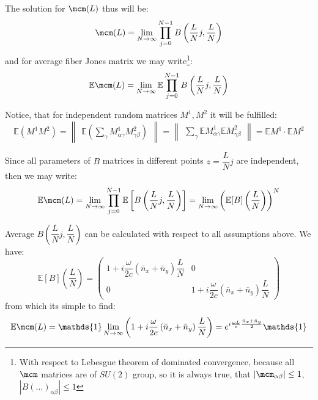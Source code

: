 \documentclass[12pt, notitlepage]{report}
\begin{document}
The solution for $\mcm(L)$ thus will be:
\begin{equation*}
	\mcm(L) = \lim\limits_{N\rightarrow\infty}\prod\limits_{j=0}^{N-1} B\left(\dfrac{L}{N}j, \dfrac{L}{N}\right)
\end{equation*}
and for average fiber Jones matrix we may write\footnote{With respect to Lebesgue theorem of dominated convergence, because all $\mcm$ matrices are of $SU(2)$ group, so it is always true, that $|\mcm_{\alpha\beta}| \leq 1$, $|B(\dots)_{\alpha\beta}| \leq 1$}:
\begin{equation*}
	\mathbb{E}\mcm(L) = \lim\limits_{N\rightarrow\infty}\mathbb{E}\prod\limits_{j=0}^{N-1} B\left(\dfrac{L}{N}j, \dfrac{L}{N}\right)
\end{equation*}

Notice, that for independent random matrices $M^1, M^2$ it will be fulfilled:
\begin{equation*}
	\mathbb{E}\left(M^1 M^2\right) = \begin{Vmatrix}
		\mathbb{E}\left(\sum_\gamma M^1_{\alpha\gamma}M^2_{\gamma\beta}\right) 
	\end{Vmatrix} = \begin{Vmatrix}
	\sum_\gamma \mathbb{E}M^1_{\alpha\gamma} \mathbb{E}M^2_{\gamma\beta}
\end{Vmatrix} = \mathbb{E}M^1\cdot \mathbb{E}M^2
\end{equation*}


Since all parameters of $B$ matrices in different points $z = \dfrac{L}{N}j$ are independent, then we may write:
\begin{equation*}
	\mathbb{E}\mcm(L) = \lim\limits_{N\rightarrow\infty}\prod\limits_{j=0}^{N-1} \mathbb{E}\left[B\left(\dfrac{L}{N}j, \dfrac{L}{N}\right)\right] = \lim\limits_{N\rightarrow\infty} \left(\mathbb{E}[B]\left(\dfrac{L}{N}\right)\right)^N
\end{equation*}

Average $B\left(\dfrac{L}{N}j, \dfrac{L}{N}\right)$ can be calculated with respect to all assumptions above. We have:
\begin{equation*}
	\mathbb{E}[B]\left(\dfrac{L}{N}\right) = \begin{pmatrix}
		1 + i\dfrac{\omega}{2c}\left(\bar{n}_x + \bar{n}_y\right)\dfrac{L}{N} & 0 \\
		0 & 1 + i\dfrac{\omega}{2c}\left(\bar{n}_x + \bar{n}_y\right)\dfrac{L}{N}
	\end{pmatrix}
\end{equation*}
from which its simple to find:
\begin{equation}
	\mathbb{E}\mcm(L) = \mathds{1}\lim\limits_{N\rightarrow\infty}\left(1 + i\dfrac{\omega}{2c}\left(\bar{n}_x + \bar{n}_y\right)\dfrac{L}{N} \right) =  e^{i\frac{\omega L}{c}\frac{\bar{n}_x + \bar{n}_y}{2}}\mathds{1}
\end{equation}
\end{document}
